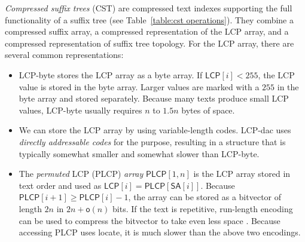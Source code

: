 \documentclass[a4paper,11pt]{llncs}
\newcommand{\CST}{\textsf{CST}}
\newcommand{\mSA}{\ensuremath{\mathsf{SA}}}
\newcommand{\LCP}{\textsf{LCP}}
\newcommand{\PLCP}{\textsf{PLCP}}
\newcommand{\LCPbyte}{\textsf{LCP\nobreakdash-byte}}
\newcommand{\LCPdac}{\textsf{LCP\nobreakdash-dac}}
\newcommand{\mLCP}{\ensuremath{\mathsf{LCP}}}
\newcommand{\mPLCP}{\ensuremath{\mathsf{PLCP}}}
\newcommand{\locate}{\textsf{locate}}
\newcommand{\oh}{\ensuremath{\mathsf{o}}}
\begin{document}
\emph{Compressed suffix trees} (\CST) \cite{Sadakane2007} are compressed text indexes supporting the full functionality of a suffix tree (see Table~\ref{table:cst operations}). They combine a compressed suffix array, a compressed representation of the \LCP{} array, and a compressed representation of suffix tree topology. For the \LCP{} array, there are several common representations:
\begin{itemize}
\item \LCPbyte{} \cite{Abouelhoda2004} stores the \LCP{} array as a byte array. If $\mLCP[i] < 255$, the \LCP{} value is stored in the byte array. Larger values are marked with a $255$ in the byte array and stored separately. Because many texts produce small \LCP{} values, \LCPbyte{} usually requires $n$ to $1.5n$ bytes of space.
\item We can store the \LCP{} array by using variable-length codes. \LCPdac{} uses \emph{directly addressable codes} \cite{Brisaboa2009} for the purpose, resulting in a structure that is typically somewhat smaller and somewhat slower than \LCPbyte.
\item The \emph{permuted} \LCP{} (\PLCP) \emph{array} \cite{Sadakane2007} $\mPLCP[1,n]$ is the \LCP{} array stored in text order and used as $\mLCP[i] = \mPLCP[\mSA[i]]$. Because $\mPLCP[i+1] \ge \mPLCP[i]-1$, the array can be stored as a bitvector of length $2n$ in $2n+\oh(n)$ bits. If the text is repetitive, run-length encoding can be used to compress the bitvector to take even less space \cite{Fischer2009a}. Because accessing \PLCP{} uses \locate, it is much slower than the above two encodings.
\end{itemize}
\end{document}
